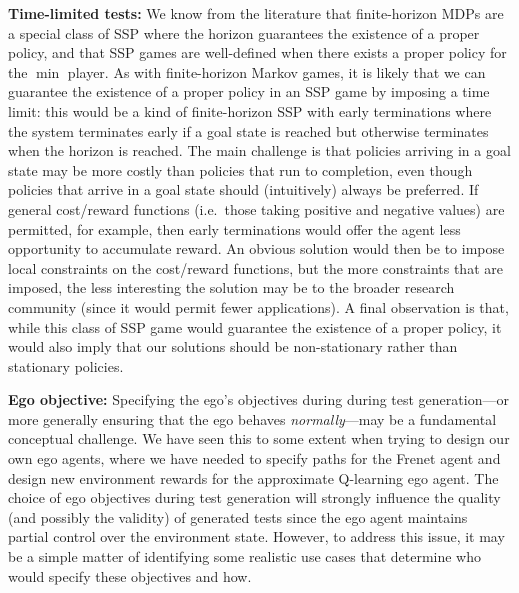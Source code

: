 \documentclass[10pt]{article}
\theoremstyle{plain}
\newenvironment{note}[1][]{\par\smallskip\noindent\textbf{#1}\rmfamily}{\smallskip}
\begin{document}
\begin{note}[Time-limited tests:]
    We know from the literature that finite-horizon MDPs are a special class of SSP where the horizon guarantees the existence of a proper policy, and that SSP games are well-defined when there exists a proper policy for the $\min$ player.
    As with finite-horizon Markov games, it is likely that we can guarantee the existence of a proper policy in an SSP game by imposing a time limit: this would be a kind of finite-horizon SSP with early terminations where the system terminates early if a goal state is reached but otherwise terminates when the horizon is reached.
    The main challenge is that policies arriving in a goal state may be more costly than policies that run to completion, even though policies that arrive in a goal state should (intuitively) always be preferred.
    If general cost/reward functions (i.e.\ those taking positive and negative values) are permitted, for example, then early terminations would offer the agent less opportunity to accumulate reward.
    An obvious solution would then be to impose local constraints on the cost/reward functions, but the more constraints that are imposed, the less interesting the solution may be to the broader research community (since it would permit fewer applications).
    A final observation is that, while this class of SSP game would guarantee the existence of a proper policy, it would also imply that our solutions should be non-stationary rather than stationary policies.
\end{note}

\begin{note}[Ego objective:]
    Specifying the ego's objectives during during test generation---or more generally ensuring that the ego behaves \emph{normally}---may be a fundamental conceptual challenge.
    We have seen this to some extent when trying to design our own ego agents, where we have needed to specify paths for the Frenet agent and design new environment rewards for the approximate Q-learning ego agent.
    The choice of ego objectives during test generation will strongly influence the quality (and possibly the validity) of generated tests since the ego agent maintains partial control over the environment state.
    However, to address this issue, it may be a simple matter of identifying some realistic use cases that determine who would specify these objectives and how.
\end{note}
\end{document}
